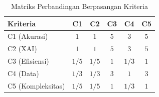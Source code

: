 \begin{table}[H]
	\centering
	\caption{Matriks Perbandingan Berpasangan Kriteria}
	\label{tab:perbandingan_kriteria}
	\begin{tabular}{|l|c|c|c|c|c|}
		\hline
		Kriteria & C1 & C2 & C3 & C4 & C5 \\ \hline
		C1 (Akurasi) & $1$ & $1$ & $5$ & $3$ & $5$ \\ \hline
		C2 (XAI) & $1$ & $1$ & $5$ & $3$ & $5$ \\ \hline
		C3 (Efisiensi) & $1/5$ & $1/5$ & $1$ & $1/3$ & $1$ \\ \hline
		C4 (Data) & $1/3$ & $1/3$ & $3$ & $1$ & $3$ \\ \hline
		C5 (Kompleksitas) & $1/5$ & $1/5$ & $1$ & $1/3$ & $1$ \\ \hline
	\end{tabular}
\end{table}
